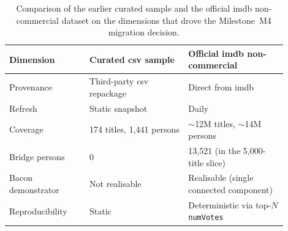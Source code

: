 \begin{table}[H]
\centering
\small
\begin{tabular}{p{0.26\linewidth} p{0.32\linewidth} p{0.32\linewidth}}
\hline
\textbf{Dimension} & \textbf{Curated \ac{csv} sample} & \textbf{Official \ac{imdb} non-commercial} \\
\hline
Provenance              & Third-party \ac{csv} repackage              & Direct from \ac{imdb} \\
Refresh                 & Static snapshot                        & Daily \\
Coverage                & 174 titles, 1{,}441 persons            & $\sim$12M titles, $\sim$14M persons \\
Bridge persons          & 0                                      & 13{,}521 (in the 5{,}000-title slice) \\
Bacon demonstrator      & Not realisable                         & Realisable (single connected component) \\
Reproducibility         & Static                                 & Deterministic via top-$N$ \texttt{numVotes} \\
\hline
\end{tabular}
\caption{Comparison of the earlier curated sample and the official \ac{imdb} non-commercial dataset on the dimensions that drove the Milestone~M4 migration decision.}
\label{tab:dataset-comparison}
\end{table}
